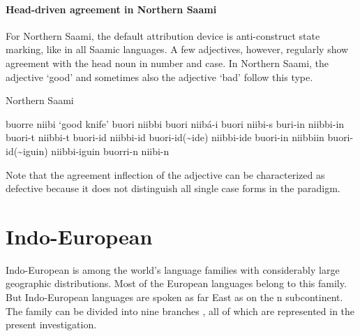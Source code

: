 \paragraph*{Head\hyp{}driven agreement in Northern Saami}
For Northern Saami, the default attribution device is anti\hyp{}construct state marking, like in all Saamic languages. A few adjectives, however, regularly show agreement with the head noun in number and case. In Northern Saami, the adjective ‘good’ and sometimes also the adjective ‘bad’ follow this type.
\begin{exe}
\settowidth{}
\ex \rm{Northern Saami \citep[83]{nickel1990}}
\begin{xlist}
\ex	buorre niibi						\rm{‘good knife’}	
\ex	buori niibbi										
\ex	buori niibá-i										
\ex	buori niibi-s										
\ex	buri-in niibbi-in										
\ex	buori-t niibbi-t										
\ex	buori-id niibbi-id									
\ex	buori-id(\textasciitilde ide) niibbi-ide						
\ex	buori-in niibbiin										
\ex	buori-id(\textasciitilde iguin) niibbi-iguin					
\ex	buorri-n niibi-n										
\end{xlist}
\end{exe}
Note that the agreement inflection of the adjective can be characterized as defective because it does not distinguish all single case forms in the paradigm.

\section{Indo-European}
Indo-European is among the world's language families with considerably large geographic distributions. Most of the European languages belong to this family. But Indo-European languages are spoken as far East as on the n subcontinent. The family can be divided into nine branches \cite[218]{salminen2007}, all of which are represented in the present investigation.

